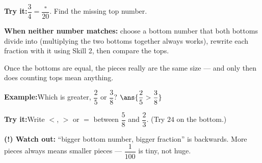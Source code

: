 \documentclass[12pt]{article}
\begin{document}
\begin{tryitbox}
\textbf{Try it:}\quad $\dfrac{3}{4} = \dfrac{\square}{20}$. Find the missing top
number.\\[2pt]
\end{tryitbox}


\begin{formulabox}
\textbf{When neither number matches:} choose a bottom number that both bottoms
divide into (multiplying the two bottoms together always works), rewrite each
fraction with it using Skill 2, then compare the tops.\par
\smallskip
Once the bottoms are equal, the pieces really are the same size --- and only
then does counting tops mean anything.
\end{formulabox}

\begin{examplebox}
\textbf{Example:}\quad Which is greater, $\dfrac{2}{5}$ or $\dfrac{3}{8}$?
$\ans{\dfrac{2}{5} > \dfrac{3}{8}}$
\end{examplebox}

\begin{tryitbox}
\textbf{Try it:}\quad Write $<$, $>$ or $=$ between $\dfrac{5}{8}$ and
$\dfrac{2}{3}$. (Try $24$ on the bottom.)\\[2pt]
\end{tryitbox}

\begin{watchoutbox}
\textbf{(!) Watch out:} ``bigger bottom number, bigger fraction'' is backwards.
More pieces always means smaller pieces --- $\dfrac{1}{100}$ is tiny, not huge.
\end{watchoutbox}
\end{document}
